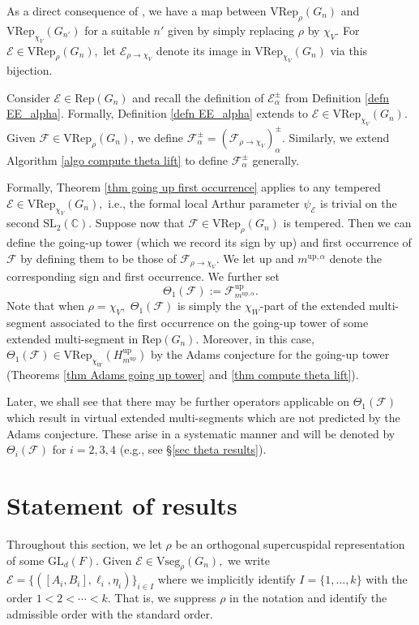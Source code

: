 \documentclass[11pt,letterpaper]{amsart}
\newcommand{\Vseg}{{\mathrm{Vseg}}}
\newcommand{\Rep}{{\mathrm{Rep}}}
\newcommand{\VRep}{{\mathrm{VRep}}}
\newcommand{\up}{{\mathrm{up}}}
\newcommand{\GL}{\mathrm{GL}}
\newcommand{\SL}{\mathrm{SL}}
\newcommand{\BC}{\mathbb{C}}
\newcommand{\EE}{\mathcal{E}}
\newcommand{\FF}{\mathcal{F}}
\numberwithin{equation}{section}
\begin{document}
As a direct consequence of \cite[Theorems 3.6, 4.4]{Ato20b}, we have a map between $\VRep_\rho(G_n)$ and $\VRep_{\chi_V}(G_{n'})$ for a suitable $n'$ given by simply replacing $\rho$ by $\chi_V.$ For  $\EE\in\VRep_\rho(G_n),$ let $\EE_{\rho\rightarrow\chi_V}$ denote its image in $\VRep_{\chi_V}(G_n)$ via this bijection. 

Consider $\EE\in\Rep(G_n)$ and recall the definition of $\EE_\alpha^\pm$ from Definition \ref{defn EE_alpha}. Formally, Definition \ref{defn EE_alpha} extends to $\EE\in\VRep_{\chi_V}(G_n).$ Given $\FF\in\VRep_\rho(G_n)$, we define $\FF_\alpha^\pm=(\FF_{\rho\rightarrow\chi_V})_\alpha^\pm.$ Similarly, we extend Algorithm \ref{algo compute theta lift} to define $\FF_\alpha^\pm$ generally.

Formally, Theorem \ref{thm going up first occurrence} applies to any tempered $\EE\in\VRep_{\chi_V}(G_n),$ i.e., the formal local Arthur parameter $\psi_\EE$ is trivial on the second $\SL_2(\BC).$
Suppose now that $\FF\in\VRep_\rho(G_n)$ is tempered. Then we can define the going-up tower (which we record its sign by $\up$) and first occurrence of $\FF$ by defining them to be those of $\FF_{\rho\rightarrow\chi_V}$. We let $\up$ and $m^{\up,\alpha}$ denote the corresponding sign and first occurrence. We further set
\[
\Theta_1(\FF):=\FF^\up_{m^{\up,\alpha}}.
\]
Note that when $\rho=\chi_V,$ $\Theta_1(\FF)$ is simply the $\chi_W$-part of the extended multi-segment associated to the first occurrence on the going-up tower of some extended multi-segment in $\Rep(G_n)$. Moreover, in this case, $\Theta_1(\FF)\in\VRep_{\chi_W}(H_{m^\up}^\up)$ by the Adams conjecture for the going-up tower (Theorems \ref{thm Adams going up tower} and \ref{thm compute theta lift}).

Later, we shall see that there may be further operators applicable on $\Theta_1(\FF)$ which result in virtual extended multi-segments which are not predicted by the Adams conjecture. These arise in a systematic manner and will be denoted by $\Theta_i(\FF)$ for $i=2,3,4$ (e.g., see \S\ref{sec theta results}).



\section{Statement of results}
\label{sec-results}

Throughout this section, we let $\rho$ be an orthogonal supercuspidal representation of some $\GL_d(F)$. 
Given $\EE\in \Vseg_\rho(G_n),$ we write $\EE= \{([A_i, B_i], \ell_i, \eta_i)\}_{i \in I}$ where we implicitly identify $I=\{1,\dots,k\}$ with the order $1<2<\cdots<k.$ That is, we suppress $\rho$ in the notation and identify the admissible order with the standard order.
\end{document}
